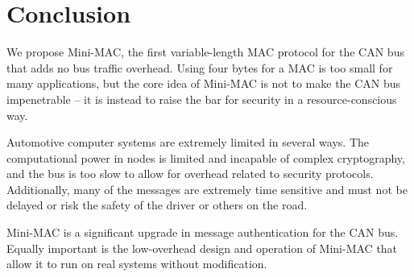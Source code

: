 \section{Conclusion}

We propose Mini-MAC, the first variable-length MAC protocol for the CAN bus that adds no bus traffic overhead. Using four bytes for a MAC is too small for many applications, but the core idea of Mini-MAC is not to make the CAN bus impenetrable -- it is instead to raise the bar for security in a resource-conscious way. 

Automotive computer systems are extremely limited in several ways. The computational power in nodes is limited and incapable of complex cryptography, and the bus is too slow to allow for overhead related to security protocols. Additionally, many of the messages are extremely time sensitive and must not be delayed or risk the safety of the driver or others on the road.

Mini-MAC is a significant upgrade in message authentication for the CAN bus. Equally important is the low-overhead design and operation of Mini-MAC that allow it to run on real systems without modification.


